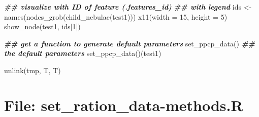 \documentclass[
]{article}
\newenvironment{Shaded}{\begin{snugshade}}{\end{snugshade}}
\newcommand{\AttributeTok}[1]{\textcolor[rgb]{0.77,0.63,0.00}{#1}}
\newcommand{\DecValTok}[1]{\textcolor[rgb]{0.00,0.00,0.81}{#1}}
\newcommand{\DocumentationTok}[1]{\textcolor[rgb]{0.56,0.35,0.01}{\textbf{\textit{#1}}}}
\newcommand{\FunctionTok}[1]{\textcolor[rgb]{0.00,0.00,0.00}{#1}}
\newcommand{\NormalTok}[1]{#1}
\newcommand{\OtherTok}[1]{\textcolor[rgb]{0.56,0.35,0.01}{#1}}
\begin{document}
\begin{Shaded}
\begin{Highlighting}[]
\DocumentationTok{\#\# visualize with ID of \textquotesingle{}feature\textquotesingle{} (.features\_id)}
\DocumentationTok{\#\# with legend}
\NormalTok{ids }\OtherTok{\textless{}{-}} \FunctionTok{names}\NormalTok{(}\FunctionTok{nodes\_grob}\NormalTok{(}\FunctionTok{child\_nebulae}\NormalTok{(test1)))}
\FunctionTok{x11}\NormalTok{(}\AttributeTok{width =} \DecValTok{15}\NormalTok{, }\AttributeTok{height =} \DecValTok{5}\NormalTok{)}
\FunctionTok{show\_node}\NormalTok{(test1, ids[}\DecValTok{1}\NormalTok{])}

\DocumentationTok{\#\# get a function to generate default parameters}
\FunctionTok{set\_ppcp\_data}\NormalTok{()}
\DocumentationTok{\#\# the default parameters}
\FunctionTok{set\_ppcp\_data}\NormalTok{()(test1)}

\FunctionTok{unlink}\NormalTok{(tmp, T, T)}
\end{Highlighting}
\end{Shaded}

\hypertarget{file-set_ration_data-methods.r}{%
\section{File: set\_ration\_data-methods.R}\label{file-set_ration_data-methods.r}}
\end{document}
